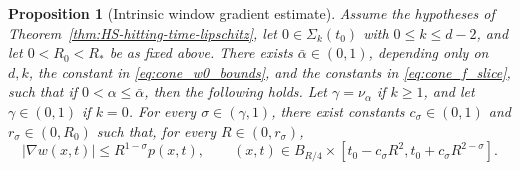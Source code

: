 \documentclass[11pt]{amsart}
\numberwithin{equation}{section}
\numberwithin{figure}{section}
\theoremstyle{plain}
\newtheorem{prop}[thm]{Proposition}
\theoremstyle{definition}
\theoremstyle{remark}
\theoremstyle{plain}
\begin{document}
\begin{prop}[Intrinsic window gradient estimate]\label{lem:cone_gradient_intrinsic_window}
Assume the hypotheses of Theorem~\ref{thm:HS-hitting-time-lipschitz}, let
\(0\in\Sigma_k(t_0)\) with \(0\leq k\leq d-2\), and let \(0<R_0<R_*\) be as fixed above.
There exists
\(\bar\alpha\in(0,1)\), depending only on \(d,k\), the constant in
\eqref{eq:cone_w0_bounds}, and the constants in \eqref{eq:cone_f_slice}, such
that if \(0<\alpha\leq\bar\alpha\), then the following holds.
Let \(\gamma=\nu_\alpha\) if \(k\geq1\), and let
\(\gamma\in(0,1)\) if \(k=0\).
For every \(\sigma\in(\gamma,1)\), there exist constants
\(c_\sigma\in(0,1)\) and \(r_\sigma\in(0,R_0)\) such that, for every \(R\in(0,r_\sigma)\),
\begin{equation}\label{eq:cone_gradient_intrinsic_window}
    |\nabla w(x,t)|\leq R^{1-\sigma} p(x,t),
    \qquad
    (x,t)\in B_{R/4}\times [t_0-c_\sigma R^2,t_0+c_\sigma R^{2-\sigma}].
\end{equation}
\end{prop}
\end{document}

